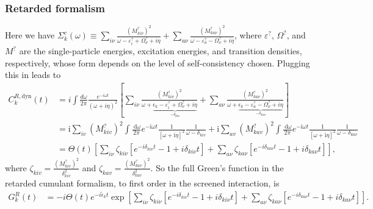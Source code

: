 \subsubsection{Retarded formalism}
Here we have $\Sigma _k^{c}(\omega)\equiv\sum_{i\nu} \frac{\left(M_{ki\nu}^?\right)^2}{\omega  - \varepsilon_i^{?} + \Omega_\nu^? + i \eta} + \sum_{a\nu} \frac{\left(M_{ka\nu}^?\right)^2}{\omega  - \varepsilon_a^{?} - \Omega_\nu^? + i \eta}$,
 where $\varepsilon^?$, $\Omega ^?$, and $M^?$ are the single-particle energies, excitation energies, and transition densities, respectively, whose form depends on the level of self-consistency chosen. Plugging this in leads to 
\begin{align}
C_k^{R,\text{dyn}}(t)
&=
i 
\int \frac{d\omega}{2\pi}
\frac{e^{-i\omega t}}{(\omega + i\eta)^2}\left[\sum_{i\nu} \frac{\left(M_{ki\nu}^?\right)^2}{\omega +\underbrace{\epsilon_k - \varepsilon_i^? + \Omega_\nu^? + i \eta}_{-\delta_{ki\nu}}} + \sum_{a\nu} \frac{\left(M_{ka\nu}^?\right)^2}{\omega +\underbrace{\epsilon_k - \varepsilon_a^? - \Omega_\nu^? + i \eta}_{-\delta_{ka\nu}}} \right] \\
& =\mathrm{i} \sum_{i v} \left(M_{k i v}^?\right)^2 \int \frac{\mathrm{~d} \omega}{2 \pi} e^{-\mathrm{i} \omega t} \frac{1}{[\omega+\mathrm{i} \eta]^2} \frac{1}{\omega-\delta_{k i v}} +\mathrm{i} \sum_{a v} \left(M_{ka v}^?\right)^2 \int \frac{\mathrm{~d} \omega}{2 \pi} e^{-\mathrm{i} \omega t} \frac{1}{[\omega+\mathrm{i} \eta]^2} \frac{1}{\omega-\delta_{k a v}}
\label{eq:Cpp_1}
\\
&=\Theta(t)\left[
\sum_{i\nu} \zeta_{ki\nu} \left[ e^{-i\delta_{ki\nu} t} - 1 + i\delta_{ki\nu} t \right] + \sum_{a\nu} \zeta_{ka\nu} \left[ e^{-i\delta_{ka\nu} t} - 1 + i\delta_{ka\nu} t \right]\right],
\end{align}
where $\zeta_{k i v}=\frac{\left(M_{k i v}^?\right)^2}{\delta_{k i v}^2}$ and $\zeta_{k a v}=\frac{\left(M_{k a v}^?\right)^2}{\delta_{k a v}^2}$.
So the full Green's function in the retarded cumulant formalism, to first order in the screened interaction, is
\begin{align}
G_k^R(t)
&=
-i \Theta(t) e^{-i\tilde{\epsilon}_k t} \exp\left[
\sum_{i\nu} \zeta_{ki\nu} \left[ e^{-i\delta_{ki\nu} t} - 1 + i\delta_{ki\nu} t \right] + \sum_{a\nu} \zeta_{ka\nu} \left[ e^{-i\delta_{ka\nu} t} - 1 + i\delta_{ka\nu} t \right]
\right].
\end{align}
